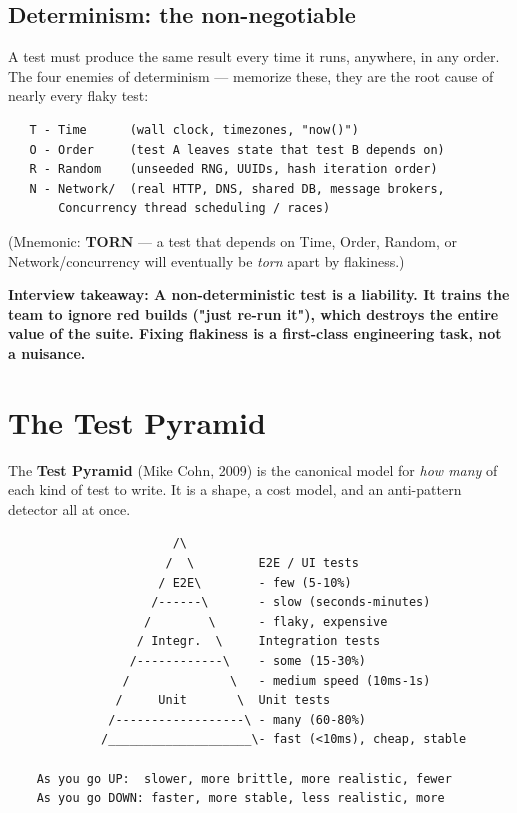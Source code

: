 \documentclass[11pt]{article}
\begin{document}
\subsection{Determinism: the non-negotiable}\label{determinism-the-non-negotiable}

A test must produce the same result every time it runs, anywhere, in any order. The four enemies of determinism --- memorize these, they are the root cause of nearly every flaky test:

\setcodelang{}

\begin{verbatim}
   T - Time      (wall clock, timezones, "now()")
   O - Order     (test A leaves state that test B depends on)
   R - Random    (unseeded RNG, UUIDs, hash iteration order)
   N - Network/  (real HTTP, DNS, shared DB, message brokers,
       Concurrency thread scheduling / races)
\end{verbatim}

(Mnemonic: \textbf{TORN} --- a test that depends on Time, Order, Random, or Network/concurrency will eventually be \emph{torn} apart by flakiness.)

\textbf{Interview takeaway: A non-deterministic test is a liability. It trains the team to ignore red builds ("just re-run it"), which destroys the entire value of the suite. Fixing flakiness is a first-class engineering task, not a nuisance.}

\section{The Test Pyramid}\label{the-test-pyramid}

The \textbf{Test Pyramid} (Mike Cohn, 2009) is the canonical model for \emph{how many} of each kind of test to write. It is a shape, a cost model, and an anti-pattern detector all at once.

\setcodelang{}

\begin{verbatim}
                       /\
                      /  \         E2E / UI tests
                     / E2E\        - few (5-10%)
                    /------\       - slow (seconds-minutes)
                   /        \      - flaky, expensive
                  / Integr.  \     Integration tests
                 /------------\    - some (15-30%)
                /              \   - medium speed (10ms-1s)
               /     Unit       \  Unit tests
              /------------------\ - many (60-80%)
             /____________________\- fast (<10ms), cheap, stable

    As you go UP:  slower, more brittle, more realistic, fewer
    As you go DOWN: faster, more stable, less realistic, more
\end{verbatim}
\end{document}
